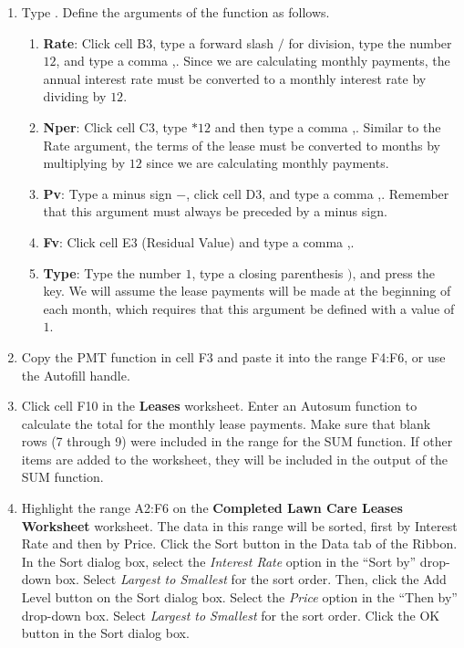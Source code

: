\begin{enumerate}
	\item Type . Define the arguments of the function as follows.

	\begin{enumerate}
		\item \textbf{Rate}: Click cell \textsf{B3}, type a forward slash $ / $ for division, type the number $ 12 $, and type a comma ,. Since we are calculating monthly payments, the annual interest rate must be converted to a monthly interest rate by dividing by $ 12 $.
		
		\item \textbf{Nper}: Click cell \textsf{C3}, type $ *12 $ and then type a comma ,. Similar to the Rate argument, the terms of the lease must be converted to months by multiplying by $ 12 $ since we are calculating monthly payments.
		
		\item \textbf{Pv}: Type a minus sign $ - $, click cell \textsf{D3}, and type a comma ,. Remember that this argument must always be preceded by a minus sign.
		
		\item \textbf{Fv}: Click cell \textsf{E3} (Residual Value) and type a comma ,.
		
		\item \textbf{Type}: Type the number $ 1 $, type a closing parenthesis $ ) $, and press the  key. We will assume the lease payments will be made at the beginning of each month, which requires that this argument be defined with a value of $ 1 $.
	\end{enumerate}

	\item Copy the PMT function in cell \textsf{F3} and paste it into the range \textsf{F4:F6}, or use the Autofill handle.
	
	\item Click cell \textsf{F10} in the \textbf{Leases} worksheet. Enter an Autosum function to calculate the total for the monthly lease payments. Make sure that blank rows (7 through 9) were included in the range for the SUM function. If other items are added to the worksheet, they will be included in the output of the SUM function.
	
	\item Highlight the range \textsf{A2:F6} on the \textbf{Completed Lawn Care Leases Worksheet} worksheet. The data in this range will be sorted, first by Interest Rate and then by Price. Click the Sort button in the Data tab of the Ribbon. In the Sort dialog box, select the \textit{Interest Rate} option in the ``Sort by'' drop-down box. Select \textit{Largest to Smallest} for the sort order. Then, click the Add Level button on the Sort dialog box. Select the \textit{Price} option in the ``Then by'' drop-down box. Select \textit{Largest to Smallest} for the sort order. Click the OK button in the Sort dialog box.
	

\end{enumerate}
